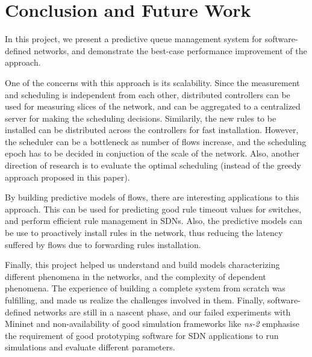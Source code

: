 \section{Conclusion and Future Work}
In this project, we present a predictive queue management system for software-defined
networks, and demonstrate the best-case performance improvement of the approach.  

One of the concerns with this approach is its scalability. Since the measurement and scheduling
is independent from each other, distributed controllers can be used for measuring slices 
of the network, and can be aggregated to a centralized server for making the scheduling decisions.
Similarily, the new rules to be installed can be distributed across the controllers for fast installation.
However, the scheduler can be a bottleneck as number of flows increase, and the scheduling epoch
has to be decided in conjuction of the scale of the network. Also, another direction of research is 
to evaluate the optimal scheduling (instead of the greedy approach proposed in this paper). 

By building predictive models of flows, there are interesting applications to this approach. This can
be used for predicting good rule timeout values for switches, and perform efficient rule management
in SDNs. Also, the predictive models can be use to proactively install rules in the network, thus reducing
the latency suffered by flows due to forwarding rules installation. 

Finally, this project helped us understand and build models characterizing different phenomena
in the networks, and the complexity of dependent phenomena. The experience of building a complete
system from scratch was fulfilling, and made us realize the challenges involved in them. Finally, software-
defined networks are still in a nascent phase, and our failed experiments with Mininet and non-availability of 
good simulation frameworks like \emph{ns-2} emphasise the requirement of good prototyping software
for SDN applications to run simulations and evaluate different parameters. 